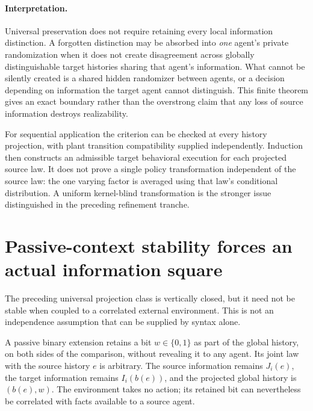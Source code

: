 \documentclass[11pt]{article}
\begin{document}
\paragraph{Interpretation.}
Universal preservation does not require retaining every local information distinction. A forgotten distinction may be absorbed into \emph{one} agent's private randomization when it does not create disagreement across globally distinguishable target histories sharing that agent's information. What cannot be silently created is a shared hidden randomizer between agents, or a decision depending on information the target agent cannot distinguish. This finite theorem gives an exact boundary rather than the overstrong claim that any loss of source information destroys realizability.

For sequential application the criterion can be checked at every history projection, with plant transition compatibility supplied independently. Induction then constructs an admissible target behavioral execution for each projected source law. It does not prove a single policy transformation independent of the source law: the one varying factor is averaged using that law's conditional distribution. A uniform kernel-blind transformation is the stronger issue distinguished in the preceding refinement tranche.

\section{Passive-context stability forces an actual information square}
The preceding universal projection class is vertically closed, but it need not be stable when coupled to a correlated external environment. This is not an independence assumption that can be supplied by syntax alone.

A passive binary extension retains a bit $w\in\{0,1\}$ as part of the global history, on both sides of the comparison, without revealing it to any agent. Its joint law with the source history $e$ is arbitrary. The source information remains $J_i(e)$, the target information remains $I_i(b(e))$, and the projected global history is $(b(e),w)$. The environment takes no action; its retained bit can nevertheless be correlated with facts available to a source agent.
\end{document}
